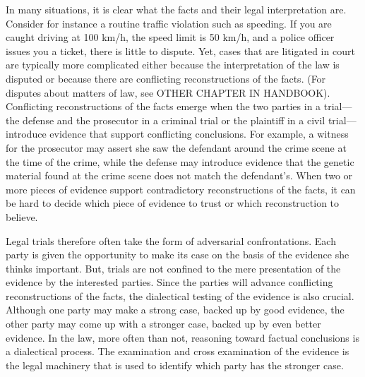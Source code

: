 \documentclass[10pt]{article}
\begin{document}
In many situations, it is clear what the facts and their legal interpretation are. Consider for instance a routine traffic violation such as speeding. If you are caught driving at 100 km/h, the speed limit is 50 km/h, and a police officer issues you a ticket, 
there is  little to dispute. Yet, cases that are litigated in court are typically more complicated either because the interpretation of 
the law is disputed or because there are conflicting reconstructions of the facts. 
(For disputes about matters of law, see OTHER CHAPTER IN HANDBOOK).
Conflicting reconstructions of the facts emerge when the two parties in a trial---the defense and the prosecutor in a criminal trial or 
the plaintiff in a civil trial---introduce evidence that support conflicting conclusions. 
For example, a witness for the prosecutor may assert she saw the defendant around the crime scene at the time of the crime, 
while the defense may introduce evidence that the genetic material found at the crime scene does not match the defendant's.
When two or more pieces of evidence support contradictory reconstructions of the facts, it can be hard 
to decide which piece of evidence to trust or which reconstruction to believe. 


Legal trials therefore often take the form of adversarial confrontations.  Each party is given the opportunity to make its case on the basis of the evidence she thinks important. But, 
trials are not confined to the mere presentation of the 
evidence by the interested parties. Since the parties will advance conflicting reconstructions of the facts, 
the dialectical testing of the evidence is also crucial. 
Although one party may make a strong case, backed up by good evidence, %
the other party may come up with a stronger case, backed up by even better evidence.  In the law, more often than not, reasoning toward factual 
conclusions is a dialectical process. The examination and cross examination of the evidence 
is the legal machinery that is used to identify which party has the stronger case.
\end{document}
